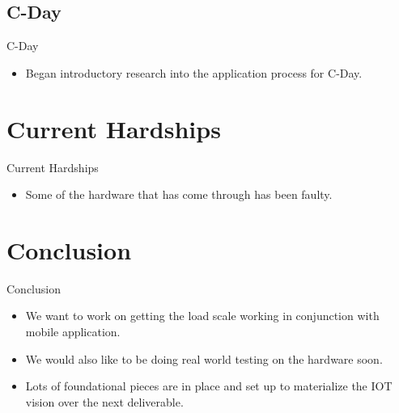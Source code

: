 \documentclass{beamer}
\begin{document}
\subsection{C-Day}
\begin{frame}{C-Day}
\begin{itemize}
	\item<1-> Began introductory research into the application process for C-Day. 
\end{itemize}
\end{frame}

\section{Current Hardships}
\begin{frame}{Current Hardships}
\begin{itemize}
	\item<1-> Some of the hardware that has come through has been faulty.
\end{itemize}
\end{frame}

\section{Conclusion}
\begin{frame}{Conclusion}
\begin{itemize}
	\item<1-> We want to work on getting the load scale working in conjunction with mobile application. \pause
	\item<2-> We would also like to be doing real world testing on the hardware soon. \pause
	\item<3-> Lots of foundational pieces are in place and set up to materialize the IOT vision over the next deliverable. 
\end{itemize}

\end{frame}
\end{document}
